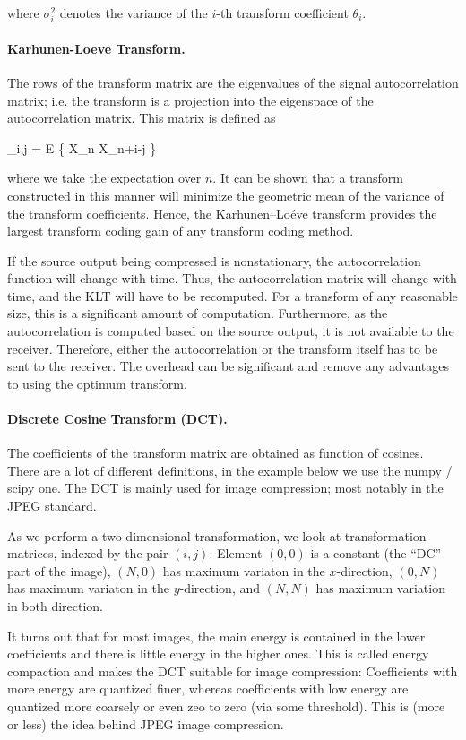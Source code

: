 where $\sigma_i^2$ denotes the variance of the $i$-th transform coefficient $\theta_i$.



\paragraph{Karhunen-Loeve Transform.} The rows of the transform matrix are the eigenvalues of the signal autocorrelation matrix; i.e. the transform is a projection into the eigenspace of the autocorrelation matrix. This matrix is defined as

\bee
[ \Rbf ]_{i,j} = E \{ X_n X_{n+i-j} \}
\eee

where we take the expectation over $n$. It can be shown that a transform constructed in this manner will minimize the geometric mean of the variance of the transform coefficients. Hence, the Karhunen–Loéve transform provides the largest transform coding gain of any transform coding method.

If the source output being compressed is nonstationary, the autocorrelation function will change with time. Thus, the autocorrelation matrix will change with time, and the KLT will have to be recomputed. For a transform of any reasonable size, this is a significant amount of computation. Furthermore, as the autocorrelation is computed based on the source output, it is not available to the receiver. Therefore, either the autocorrelation or the transform itself has to be sent to the receiver. The overhead can be significant and remove any advantages to using the optimum transform.


\paragraph{Discrete Cosine Transform (DCT).}

The coefficients of the transform matrix are obtained as function of cosines. There are a lot of different definitions, in the example below we use the numpy / scipy one. The DCT is mainly used for image compression; most notably in the JPEG standard.

As we perform a two-dimensional transformation, we look at transformation matrices, indexed by the pair $(i,j)$. Element $(0,0)$ is a constant (the ``DC'' part of the image), $(N,0)$ has maximum variaton in the $x$-direction, $(0,N)$ has maximum variaton in the $y$-direction, and $(N,N)$ has maximum variation in both direction.

It turns out that for most images, the main energy is contained in the lower coefficients and there is little energy in the higher ones. This is called energy compaction and makes the DCT suitable for image compression: Coefficients with more energy are quantized finer, whereas coefficients with low energy are quantized more coarsely or even zeo to zero (via some threshold). This is (more or less) the idea behind JPEG image compression.



